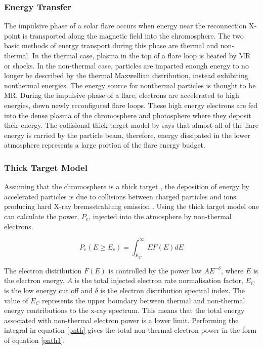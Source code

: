 \subsubsection{Energy Transfer}
The impulsive phase of a solar flare occurs when energy near the reconnection X-point is transported along the magnetic field into the chromosphere. The two basic methods of energy transport during this phase are thermal and non-thermal. In the thermal case, plasma in the top of a flare loop is heated by MR or shocks. In the non-thermal case, particles are imparted enough energy to no longer be described by the thermal Maxwellian distribution, instead exhibiting nonthermal energies. The energy source for nonthermal particles is thought to be MR. During the impulsive phase of a flare, electrons are accelerated to high energies, down newly reconfigured flare loops. These high energy electrons are fed into the dense plasma of the chromosphere and photosphere where they deposit their energy. The collisional thick target model by \cite{1971SoPh...18..489B} says that almost all of the flare energy is carried by the particle beam, therefore, energy dissipated in the lower atmosphere represents a large portion of the flare energy budget.

\subsubsection{Thick Target Model} Assuming that the chromosphere is a thick target , the deposition of energy by accelerated particles is due to collisions between charged particles and ions producing hard X-ray bremsstrahlung emission \citep{1967SvA....11..258K}. Using the thick target model \citep{1971SoPh...18..489B} one can calculate the power, $P_{e}$, injected into the atmosphere by non-thermal electrons.  
 
\begin{equation}\label{pnth}
P_{e}(E \geq E_{c}) = \int_{E_{C}}^{\infty} EF(E)dE
\end{equation}

The electron distribution $F(E)$ is controlled by the power law $AE^{-\delta}$, where $E$ is the electron energy, $A$ is the total injected electron rate normalisation factor, $E_{C}$ is the low energy cut off and $\delta$ is the electron distribution spectral index. The value of $E_{C}$ represents the upper boundary between thermal and non-thermal energy contributions to the x-ray spectrum. This means that the total energy associated with non-thermal electron power is a lower limit. Performing the integral in equation \ref{pnth} gives the total non-thermal electron power in the form of equation \ref{pnth1}.

